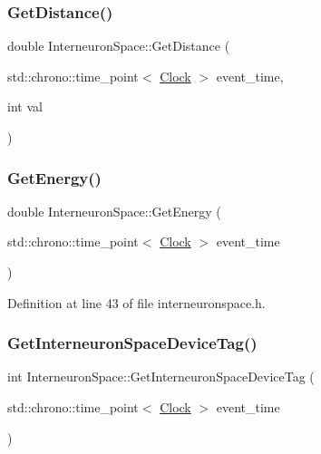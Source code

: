 \subsubsection{\texorpdfstring{Get\+Distance()}{GetDistance()}}
{\footnotesize\ttfamily double Interneuron\+Space\+::\+Get\+Distance (\begin{DoxyParamCaption}\item[{std\+::chrono\+::time\+\_\+point$<$ \mbox{\hyperlink{universe_8h_a0ef8d951d1ca5ab3cfaf7ab4c7a6fd80}{Clock}} $>$}]{event\+\_\+time,  }\item[{int}]{val }\end{DoxyParamCaption})}

\mbox{\label{class_interneuron_space_a677430712211956219767d4fa71d20e6}} 
\subsubsection{\texorpdfstring{Get\+Energy()}{GetEnergy()}}
{\footnotesize\ttfamily double Interneuron\+Space\+::\+Get\+Energy (\begin{DoxyParamCaption}\item[{std\+::chrono\+::time\+\_\+point$<$ \mbox{\hyperlink{universe_8h_a0ef8d951d1ca5ab3cfaf7ab4c7a6fd80}{Clock}} $>$}]{event\+\_\+time }\end{DoxyParamCaption})\hspace{0.3cm}{\ttfamily [inline]}}



Definition at line 43 of file interneuronspace.\+h.

\mbox{\label{class_interneuron_space_a66b6683bab6872dfece6111a8ccfb1d7}} 
\subsubsection{\texorpdfstring{Get\+Interneuron\+Space\+Device\+Tag()}{GetInterneuronSpaceDeviceTag()}}
{\footnotesize\ttfamily int Interneuron\+Space\+::\+Get\+Interneuron\+Space\+Device\+Tag (\begin{DoxyParamCaption}\item[{std\+::chrono\+::time\+\_\+point$<$ \mbox{\hyperlink{universe_8h_a0ef8d951d1ca5ab3cfaf7ab4c7a6fd80}{Clock}} $>$}]{event\+\_\+time }\end{DoxyParamCaption})\hspace{0.3cm}{\ttfamily [inline]}}



